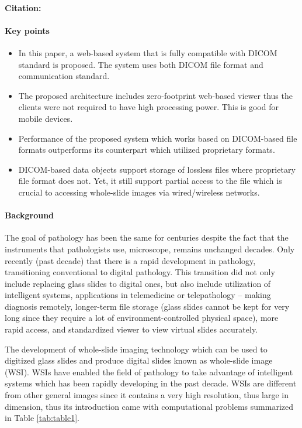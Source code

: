 \documentclass{article}
\begin{document}
\paragraph{Citation:} \cite{marques_godinho_efficient_2017}
\paragraph{Key points}
\begin{itemize}
  \item In this paper, a web-based system that is fully compatible with DICOM standard is proposed. The system uses both DICOM file format and communication standard.
  \item The proposed architecture includes zero-footprint web-based viewer thus the clients were not required to have high processing power. This is good for mobile devices. 
  \item Performance of the proposed system which works based on DICOM-based file formats outperforms its counterpart which utilized proprietary formats. 
  \item DICOM-based data objects support storage of lossless files where proprietary file format does not. Yet, it still support partial access to the file which is crucial to accessing whole-slide images via wired/wireless networks. 
\end{itemize}

\paragraph{Background}
The goal of pathology has been the same for centuries despite the fact that the instruments that pathologists use, microscope, remains unchanged decades. Only recently (past decade) that there is a rapid development in pathology, transitioning conventional to digital pathology. This transition did not only include replacing glass slides to digital ones, but also include utilization of intelligent systems, applications in telemedicine or telepathology – making diagnosis remotely, longer-term file storage (glass slides cannot be kept for very long since they require a lot of environment-controlled physical space), more rapid access, and standardized viewer to view virtual slides accurately. 

The development of whole-slide imaging technology which can be used to digitized glass slides and produce digital slides known as whole-slide image (WSI). WSIs have enabled the field of pathology to take advantage of intelligent systems which has been rapidly developing in the past decade. WSIs are different from other general images since it contains a very high resolution, thus large in dimension, thus its introduction came with computational problems summarized in Table \ref{tab:table1}. 
\end{document}
